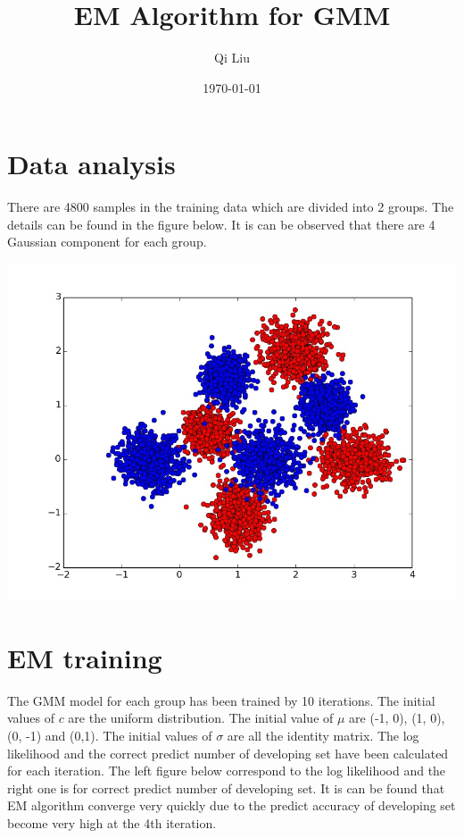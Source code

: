 \documentclass{article}
\title{EM Algorithm for GMM}
\author{Qi Liu}
\date{\today}
\begin{document}
	
\maketitle

\section{Data analysis}
There are 4800 samples in the training data which are divided into 2 groups. The details can be found in the figure below. It is can be observed that there are 4 Gaussian component for each group.

\includegraphics[width=\textwidth]{../result/train.jpg}

\section{EM training}
The GMM model for each group has been trained by 10 iterations. The initial values of $c$ are the uniform distribution. The initial value of $\mu$ are (-1, 0), (1, 0), (0, -1) and (0,1). The initial values of $\sigma$ are all the identity matrix. The log likelihood and the correct predict number of developing set have been calculated for each iteration. The left figure below correspond to the log likelihood and the right one is for correct predict number of developing set. It is can be found that EM algorithm converge very quickly due to the predict accuracy of developing set become very high at the 4th iteration.
\end{document}
